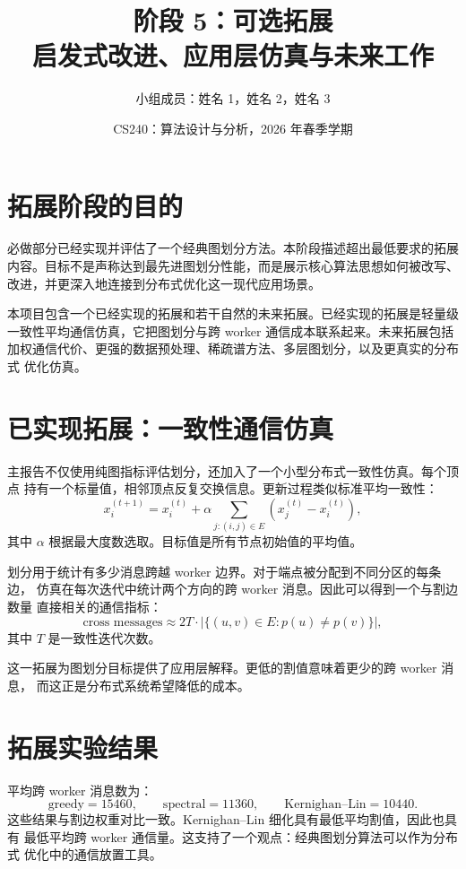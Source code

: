 \documentclass[UTF8, 11pt]{ctexart}
\title{\textbf{阶段 5：可选拓展}\\
启发式改进、应用层仿真与未来工作}
\author{小组成员：姓名 1，姓名 2，姓名 3}
\date{CS240：算法设计与分析，2026 年春季学期}
\begin{document}
\maketitle

\section{拓展阶段的目的}

必做部分已经实现并评估了一个经典图划分方法。本阶段描述超出最低要求的拓展
内容。目标不是声称达到最先进图划分性能，而是展示核心算法思想如何被改写、
改进，并更深入地连接到分布式优化这一现代应用场景。

本项目包含一个已经实现的拓展和若干自然的未来拓展。已经实现的拓展是轻量级
一致性平均通信仿真，它把图划分与跨 worker 通信成本联系起来。未来拓展包括
加权通信代价、更强的数据预处理、稀疏谱方法、多层图划分，以及更真实的分布式
优化仿真。

\section{已实现拓展：一致性通信仿真}

主报告不仅使用纯图指标评估划分，还加入了一个小型分布式一致性仿真。每个顶点
持有一个标量值，相邻顶点反复交换信息。更新过程类似标准平均一致性：
\[
    x_i^{(t+1)}
    =
    x_i^{(t)}
    +
    \alpha
    \sum_{j:(i,j)\in E}
    \left(x_j^{(t)}-x_i^{(t)}\right),
\]
其中 $\alpha$ 根据最大度数选取。目标值是所有节点初始值的平均值。

划分用于统计有多少消息跨越 worker 边界。对于端点被分配到不同分区的每条边，
仿真在每次迭代中统计两个方向的跨 worker 消息。因此可以得到一个与割边数量
直接相关的通信指标：
\[
    \text{cross messages}
    \approx
    2T \cdot |\{(u,v)\in E:p(u)\neq p(v)\}|,
\]
其中 $T$ 是一致性迭代次数。

这一拓展为图划分目标提供了应用层解释。更低的割值意味着更少的跨 worker 消息，
而这正是分布式系统希望降低的成本。

\section{拓展实验结果}

平均跨 worker 消息数为：
\[
    \text{greedy}=15460,\qquad
    \text{spectral}=11360,\qquad
    \text{Kernighan--Lin}=10440.
\]
这些结果与割边权重对比一致。Kernighan--Lin 细化具有最低平均割值，因此也具有
最低平均跨 worker 通信量。这支持了一个观点：经典图划分算法可以作为分布式
优化中的通信放置工具。
\end{document}
